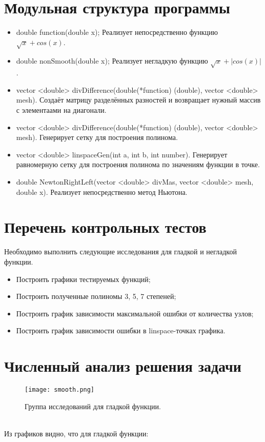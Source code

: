 \documentclass[12pt]{article}
\begin{document}
\section{Модульная структура программы}
\begin{itemize}
    \item double function(double x); Реализует непосредственно функцию $\sqrt{x} + cos(x)$.
    \item double nonSmooth(double x); Реализует негладкую функцию $\sqrt{x} + |cos(x)|$.
    \item vector <double> divDifference(double(*function) (double), vector <double> mesh). Создаёт матрицу разделённых разностей и возвращает нужный массив с элементаами на диагонали.
    \item vector <double> divDifference(double(*function) (double), vector <double> mesh). Генерирует сетку для построения полинома.
    \item vector <double> linspaceGen(int a, int b, int number). Генерирует равномерную сетку для построения полинома по значениям функции в точке.
    \item double NewtonRightLeft(vector <double> divMas, vector <double> mesh, double x). Реализует непосредственно метод Ньютона.
\end{itemize}
\section{Перечень контрольных тестов}
Необходимо выполнить следующие исследования для гладкой и негладкой функции.\\
\begin{itemize}
    \item Построить графики тестируемых функций;
    \item Построить полученные полиномы 3, 5, 7 степеней;
    \item Построить график зависимости максимальной ошибки от количества узлов;
    \item Построить график зависимости ошибки в linspace-точках графика.
\end{itemize}
\section{Численный анализ решения задачи}
\begin{figure}[h!]
\center
\texttt{[image: smooth.png]}
\caption{Группа исследований для гладкой функции.}
\end{figure}\\
Из графиков видно, что для гладкой функции:
\end{document}
